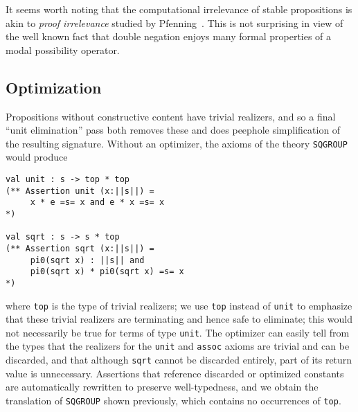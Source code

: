It seems worth noting that the computational irrelevance of
stable propositions is akin to \emph{proof irrelevance} studied by
Pfenning~\cite{pfenning01:_inten_exten_proof_irrel_modal_type_theor}.
This is not surprising in view of the well known fact that double
negation enjoys many formal properties of a modal possibility
operator.

\subsection{Optimization}

Propositions without constructive content have trivial realizers, and
so a final ``unit elimination'' pass both removes these and does 
peephole simplification of the resulting signature.   Without an optimizer,
the axioms of the theory \Verb|SQGROUP| would produce
\begin{Verbatim}
val unit : s -> top * top
(** Assertion unit (x:||s||) =  
     x * e =s= x and e * x =s= x
*)

val sqrt : s -> s * top
(** Assertion sqrt (x:||s||) =  
     pi0(sqrt x) : ||s|| and 
     pi0(sqrt x) * pi0(sqrt x) =s= x
*)
\end{Verbatim}
where \Verb|top| is the type of trivial realizers; we use 
\Verb|top| instead of \Verb|unit| to emphasize that these trivial realizers are terminating and hence safe to eliminate; this would not necessarily
be true for terms of type \Verb|unit|.  The optimizer can
easily tell from the types that the realizers for the \Verb|unit| and
\Verb|assoc| axioms are trivial and can be discarded, and that
although \Verb|sqrt| cannot be discarded entirely, part of its return
value is unnecessary.  Assertions that reference discarded or optimized
constants are automatically rewritten to preserve well-typedness, and we obtain the translation of \Verb|SQGROUP| shown previously, which contains no
occurrences of \Verb|top|.


